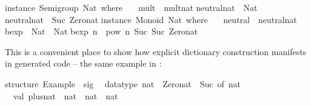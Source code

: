 \begin{isabellebody}
\begin{isamarkuptext}
\isanewline
instance\ Semigroup\ Nat\ where\ {}\isanewline
\ \ mult\ {}\ mult{}nat{}\isanewline
{}{}\isanewline
\isanewline
neutral{}nat\ {}{}\ Nat{}\isanewline
neutral{}nat\ {}\ Suc\ Zero{}nat{}\isanewline
\isanewline
instance\ Monoid\ Nat\ where\ {}\isanewline
\ \ neutral\ {}\ neutral{}nat{}\isanewline
{}{}\isanewline
\isanewline
bexp\ {}{}\ Nat\ {}{}\ Nat{}\isanewline
bexp\ n\ {}\ pow\ n\ {}Suc\ {}Suc\ Zero{}nat{}{}{}\isanewline
\isanewline
{}\isanewline%
\end{isamarkuptext}%
\isamarkuptrue%
%
\endisatagquotetypewriter
{\isafoldquotetypewriter}%
%
\isadelimquotetypewriter
%
\endisadelimquotetypewriter
%
\begin{isamarkuptext}%
\noindent This is a convenient place to show how explicit dictionary
  construction manifests in generated code -- the same example in
  :%
\end{isamarkuptext}%
\isamarkuptrue%
%
\isadelimquotetypewriter
%
\endisadelimquotetypewriter
%
\isatagquotetypewriter
%
\begin{isamarkuptext}%
structure\ Example\ {}\ sig\isanewline
\ \ datatype\ nat\ {}\ Zero{}nat\ {}\ Suc\ of\ nat\isanewline
\ \ val\ plus{}nat\ {}\ nat\ {}{}\ nat\ {}{}\ nat\isanewline

\end{isamarkuptext}
\end{isabellebody}
